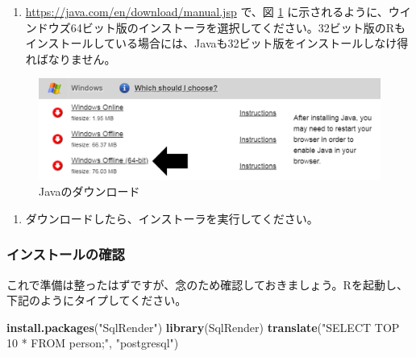 \documentclass[
  11pt]{book}
\newenvironment{Shaded}{\begin{snugshade}}{\end{snugshade}}
\newcommand{\FunctionTok}[1]{\textcolor[rgb]{0.13,0.29,0.53}{\textbf{#1}}}
\newcommand{\NormalTok}[1]{#1}
\newcommand{\StringTok}[1]{\textcolor[rgb]{0.31,0.60,0.02}{#1}}
\providecommand{\tightlist}{%
  \setlength{\itemsep}{0pt}\setlength{\parskip}{0pt}}
\theoremstyle{definition}
\theoremstyle{definition}
\theoremstyle{definition}
\theoremstyle{definition}
\theoremstyle{remark}
\begin{document}
\begin{enumerate}
\def\labelenumi{\arabic{enumi}.}
\tightlist
\item
  \url{https://java.com/en/download/manual.jsp} で、図 \ref{fig:downloadJava} に示されるように、ウインドウズ64ビット版のインストーラを選択してください。32ビット版のRもインストールしている場合には、Javaも32ビット版をインストールしなけ得ればなりません。
\end{enumerate}

\begin{figure}

{\centering \includegraphics[width=1\linewidth]{images/OhdsiAnalyticsTools/downloadJava} 

}

\caption{Javaのダウンロード}\label{fig:downloadJava}
\end{figure}

\begin{enumerate}
\def\labelenumi{\arabic{enumi}.}
\setcounter{enumi}{1}
\tightlist
\item
  ダウンロードしたら、インストーラを実行してください。
\end{enumerate}

\subsubsection*{インストールの確認}\label{ux30a4ux30f3ux30b9ux30c8ux30fcux30ebux306eux78baux8a8d}

これで準備は整ったはずですが、念のため確認しておきましょう。Rを起動し、下記のようにタイプしてください。

\begin{Shaded}
\begin{Highlighting}[]
\FunctionTok{install.packages}\NormalTok{(}\StringTok{"SqlRender"}\NormalTok{)}
\FunctionTok{library}\NormalTok{(SqlRender)}
\FunctionTok{translate}\NormalTok{(}\StringTok{"SELECT TOP 10 * FROM person;"}\NormalTok{, }\StringTok{"postgresql"}\NormalTok{)}
\end{Highlighting}
\end{Shaded}
\end{document}

